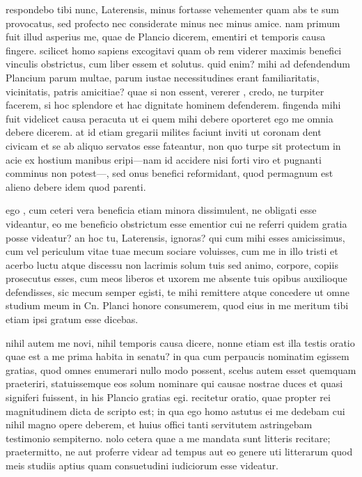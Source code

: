  respondebo tibi nunc, Laterensis, minus fortasse vehementer quam abs te sum provocatus, sed profecto nec considerate minus nec minus amice. nam primum fuit illud asperius me, quae de Plancio dicerem, ementiri et temporis causa fingere. scilicet homo sapiens excogitavi quam ob rem viderer maximis benefici vinculis obstrictus, cum liber essem et solutus. quid enim? mihi ad defendendum Plancium parum multae, parum iustae necessitudines erant familiaritatis, vicinitatis, patris amicitiae? quae si non essent, vererer , credo, ne turpiter facerem, si hoc splendore et hac dignitate hominem defenderem. fingenda mihi fuit videlicet causa peracuta ut ei quem mihi debere oporteret ego me omnia debere dicerem. at id etiam gregarii milites faciunt inviti ut coronam dent civicam et se ab aliquo servatos esse fateantur, non quo turpe sit protectum in acie ex hostium manibus eripi—nam id accidere nisi forti viro et pugnanti comminus non potest—, sed onus benefici reformidant, quod permagnum est alieno debere idem quod parenti.

 ego , cum ceteri vera beneficia etiam minora dissimulent, ne obligati esse videantur, eo me beneficio obstrictum esse ementior cui ne referri quidem gratia posse videatur? an hoc tu, Laterensis, ignoras? qui cum mihi esses amicissimus, cum vel periculum vitae tuae mecum sociare voluisses, cum me in illo tristi et acerbo luctu atque discessu non lacrimis solum tuis sed animo, corpore, copiis prosecutus esses, cum meos liberos et uxorem me absente tuis opibus auxilioque defendisses, sic mecum semper egisti, te mihi remittere atque concedere ut omne studium meum in Cn. Planci honore consumerem, quod eius in me meritum tibi etiam ipsi gratum esse dicebas.

 nihil autem me novi, nihil temporis causa dicere, nonne etiam est illa testis oratio quae est a me prima habita in senatu? in qua cum perpaucis nominatim egissem gratias, quod omnes enumerari nullo modo possent, scelus autem esset quemquam praeteriri, statuissemque eos solum nominare qui causae nostrae duces et quasi signiferi fuissent, in his Plancio gratias egi. recitetur oratio, quae propter rei magnitudinem dicta de scripto est; in qua ego homo astutus ei me dedebam cui nihil magno opere deberem, et huius offici tanti servitutem astringebam testimonio sempiterno. nolo cetera quae a me mandata sunt litteris recitare; praetermitto, ne aut proferre videar ad tempus aut eo genere uti litterarum quod meis studiis aptius quam consuetudini iudiciorum esse videatur.

